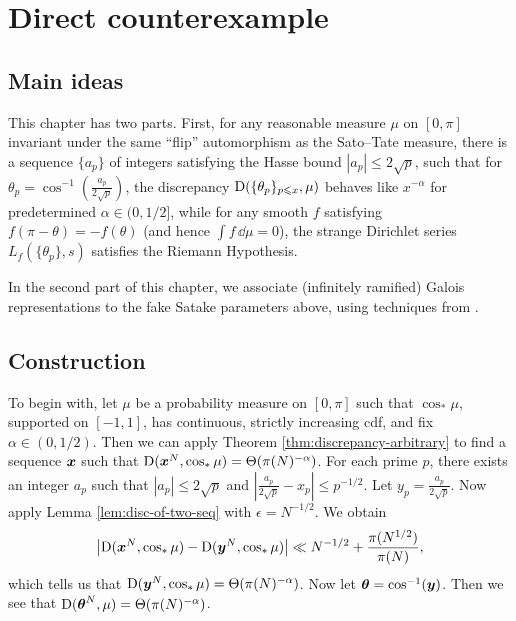 
\chapter{Direct counterexample}





\section{Main ideas}

This chapter has two parts. First, for any reasonable measure $\mu$ on 
$[0,\pi]$ invariant under the same ``flip'' automorphism as the Sato--Tate 
measure, there is a sequence $\{a_p\}$ of integers satisfying the Hasse 
bound $|a_p|\leqslant 2\sqrt p$, such that for 
$\theta_p = \cos^{-1}\left(\frac{a_p}{2\sqrt p}\right)$, the discrepancy 
$\operatorname{D}(\{\theta_p\}_{p\leqslant x},\mu)$ behaves like $x^{-\alpha}$ for 
predetermined $\alpha\in (0,1/2]$, while for any smooth $f$ satisfying 
$f(\pi-\theta) = -f(\theta)$ (and hence $\int f\, \dd\mu = 0$), the 
strange Dirichlet series $L_f(\{\theta_p\},s)$ satisfies the Riemann 
Hypothesis. 

In the second part of this chapter, we associate (infinitely ramified) Galois 
representations to the fake Satake parameters above, using techniques from 
\cite{pande-2011,khare-larsen-ramakrishna-2005}. 





\section{Construction}

To begin with, let $\mu$ be a probability measure on $[0,\pi]$ such that 
$\cos_\ast \mu$, supported on $[-1,1]$, has continuous, strictly increasing 
cdf, and fix $\alpha\in (0,1/2)$. Then we can apply Theorem 
\ref{thm:discrepancy-arbitrary} to find a sequence ${\boldsymbol x}$ such that 
$\operatorname{D}({\boldsymbol x}^N,\cos_\ast \mu) = \Theta(\pi(N)^{-\alpha})$. For each prime $p$, 
there exists an integer $a_p$ such that $|a_p|\leqslant 2\sqrt p$ and 
$\left| \frac{a_p}{2\sqrt p} - x_p\right| \leqslant p^{-1/2}$. Let 
$y_p = \frac{a_p}{2\sqrt p}$. Now apply 
Lemma \ref{lem:disc-of-two-seq} with $\epsilon = N^{-1/2}$. We obtain 
\[
	\left| \operatorname{D}({\boldsymbol x}^N,\cos_\ast \mu) - \operatorname{D}({\boldsymbol y}^N, \cos_\ast \mu)\right| \ll  N^{-1/2} + \frac{\pi(N^{1/2})}{\pi(N)} ,
\]
which tells us that $\operatorname{D}({\boldsymbol y}^N,\cos_\ast\mu) = \Theta(\pi(N)^{-\alpha})$. 
Now let ${\boldsymbol\theta} = \cos^{-1}({\boldsymbol y})$. Then we see that 
$\operatorname{D}({\boldsymbol\theta}^N,\mu) = \Theta(\pi(N)^{-\alpha})$. 

